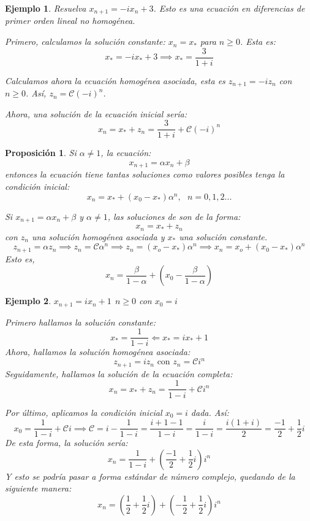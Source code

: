 \documentclass[11pt, a4paper]{article}
\makeatletter
\newif\IfInSansMode
\let\oldsf\sffamily
\renewcommand*{\sffamily}{\oldsf\mathversion{sans}\InSansModetrue}
\let\oldnorm\normalfont
\renewcommand*{\normalfont}{\oldnorm\InSansModefalse\mathversion{normal}}
\renewenvironment{proof}[1][\proofname] {\vspace{-15pt}\par\pushQED{\qed}\normalfont\topsep6\p@\@plus6\p@\relax\trivlist\item[\hskip\labelsep\it#1\@addpunct{.}]\ignorespaces}{\popQED\endtrivlist\@endpefalse}
\numberwithin{equation}{section}
\renewenvironment{proof}[1][\proofname] {\par\pushQED{\qed}\normalfont\topsep6\p@\@plus6\p@\relax\trivlist\item[\hskip\labelsep\itshape\sffamily#1\@addpunct{.}]\ignorespaces}{\popQED\endtrivlist\@endpefalse}
\theoremstyle{theorem-style}
\newtheorem{nprop}{Proposición}[section]
\theoremstyle{definition-style}
\theoremstyle{remark-style}
\theoremstyle{example-style}
\newtheorem{ejemplo}{Ejemplo}[section]
\makeatother
\begin{document}
\begin{ejemplo}
	Resuelva $x_{n+1} = -ix_n + 3$. Esto es una ecuación en diferencias de primer orden lineal no homogénea.
	\begin{proof}[Solución]
	Primero, calculamos la solución constante: $x_n = x_*$ para $n \geq 0$. Esta es:
	\[
	x_* = -i x_* +3 \implies x_* = \frac{3}{1+i}
	\]
	
	Calculamos ahora la ecuación homogénea asociada, esta es $z_{n+1} = -iz_n$ con $n \geq 0$. Así, $z_n =  \mathcal{C}(-i)^n$.
	
	Ahora, una solución de la ecuación inicial sería:
	\[
	x_n =  x_* +z_n = \frac{3}{1+i}+\mathcal{C}(-i)^n
	\]
\end{proof}

\end{ejemplo}

\begin{nprop}
	Si $\alpha \ne 1$, la ecuación:
	\[
	x_{n+1} = \alpha x_n + \beta
	\]
	entonces la ecuación tiene tantas soluciones como valores posibles tenga la condición inicial:
	\[
	x_n = x_* + (x_0-x_*)\alpha^n , \ \ \ n=0,1,2...
	\]
	
	\begin{proof}
	Si $x_{n+1} = \alpha x_n + \beta$ y $\alpha \ne 1$, las soluciones de son de la forma:
	\[
	x_n = x_*+z_n 
	\]
	con $z_n$ una solución homogénea asociada y $x_*$ una solución constante.
	\[
	z_{n+1} = \alpha z_n \implies z_{n} = \mathcal{C}\alpha^n \implies z_n = (x_o - x_*)\alpha^n \implies x_n = x_o + (x_0 - x_*)\alpha^n
	\]
	Esto es, 
	$$x_n = \frac{\beta}{1-\alpha}+\left(x_0- \frac{\beta}{1-\alpha}\right)$$
\end{proof}

\end{nprop}


\begin{ejemplo}
	$x_{n+1}=ix_n+1 \ \ n \geq 0$ con $x_0=i$
	\begin{proof}[Solución]
	Primero hallamos la solución constante:
	\[
	x_* = \frac{1}{1-i} \Leftarrow x_* = ix_* +1
	\]
	Ahora, hallamos la solución homogénea asociada:
	\[
	z_{n+1} = iz_n \text{ con $z_n = \mathcal{C}i^n$}
	\]
	Seguidamente, hallamos la solución de la ecuación completa:
	\[
	x_n = x_* + z_n = \frac{1}{1-i}+ \mathcal{C}i^n
	\]
	
	Por último, aplicamos la condición inicial $x_0=i$ dada. Así:
	\[
	x_0 = \frac{1}{1-i}+ \mathcal{C}i \implies \mathcal{C} = i-\frac{1}{1-i} =  \frac{i+1-1}{1-i} = \frac{i}{1-i} = \frac{i(1+i)}{2} = \frac{-1}{2}+ \frac{1}{2}i
	\]
	De esta forma, la solución sería:
	\[
	x_n = \frac{1}{1-i} + \left(\frac{-1}{2}+ \frac{1}{2}i\right)i^n
	\]
	Y esto se podría pasar a forma estándar de número complejo, quedando de la siguiente manera:
	$$x_n=\left(\frac{1}{2} + \frac{1}{2}i\right) + \left(-\frac{1}{2} + \frac{1}{2}i\right)i^n$$
\end{proof}
\end{ejemplo}
\end{document}

